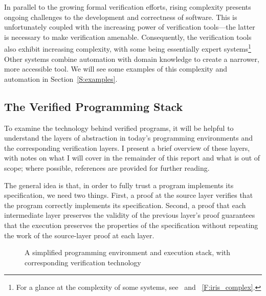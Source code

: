 In parallel to the growing formal verification efforts, rising complexity
presents ongoing challenges to the development and correctness of software. This
is unfortunately coupled with the increasing power of verification tools---the
latter is necessary to make verification amenable. Consequently, the
verification tools also exhibit increasing complexity, with some being
essentially expert systems\footnote{For a glance at the complexity of some
systems, see~\cite{Jung_2015,Jung_2016,Krebbers_2017a,Jung_2018b} and
\figurename~\ref{F:iris_complex}.} Other systems combine automation with domain
knowledge to create a narrower, more accessible tool. We will see some examples
of this complexity and automation in Section~\ref{S:examples}.

\subsection{The Verified Programming Stack}\label{S:stack}

To examine the technology behind verified programs, it will be helpful to
understand the layers of abstraction in today's programming environments and the
corresponding verification layers. I present a brief overview of these layers,
with notes on what I will cover in the remainder of this report and what is out
of scope; where possible, references are provided for further reading.

The general idea is that, in order to fully trust a program implements its
specification, we need two things. First, a proof at the source layer verifies
that the program correctly implements its specification. Second, a proof that
each intermediate layer preserves the validity of the previous layer's proof
guarantees that the execution preserves the properties of the specification
without repeating the work of the source-layer proof at each layer.

\begin{figure}[ht]
    \centering
    \caption{A simplified programming environment and execution stack, with corresponding verification technology}\label{F:abstraction}
\end{figure}

